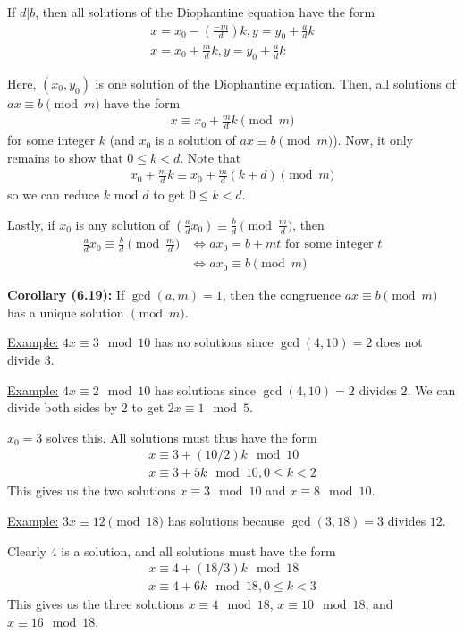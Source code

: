 \documentclass{article}
\begin{document}
If $d|b$, then all solutions of the Diophantine equation have the form \begin{align*}
    x=x_0-(\frac{-m}{d})k, y=y_0+\frac{a}{d}k\\
    x=x_0+\frac{m}{d}k, y=y_0+\frac{a}{d}k
\end{align*}

Here, $(x_0, y_0)$ is one solution of the Diophantine equation. Then, all solutions of $ax\equiv b\pmod m$ have the form \begin{align*}
    x\equiv x_0+\frac{m}{d}k\pmod m
\end{align*} for some integer $k$ (and $x_0$ is a solution of $ax\equiv b\pmod m$). Now, it only remains to show that $0\leq k<d$. Note that \begin{align*}
    x_0+\frac{m}{d}k\equiv x_0+\frac{m}{d}(k+d)\pmod m
\end{align*}so we can reduce $k$ mod $d$ to get $0\leq k<d$.

Lastly, if $x_0$ is any solution of $(\frac{a}{d}x_0)\equiv \frac{b}{d}\pmod{\frac{m}{d}}$, then \begin{align*}
    \frac{a}{d}x_0\equiv \frac{b}{d}\pmod{\frac{m}{d}}&\iff ax_0=b+mt\text{ for some integer } t\\
    &\iff ax_0\equiv b\pmod m
\end{align*}

\textbf{Corollary (6.19):} If $\gcd(a,m)=1$, then the congruence $ax\equiv b\pmod m$ has a unique solution $\pmod m$.

\underline{Example:} $4x\equiv 3\mod 10$ has no solutions since $\gcd(4,10)=2$ does not divide $3$.

\underline{Example:} $4x\equiv 2\mod 10$ has solutions since $\gcd(4,10)=2$ divides $2$. We can divide both sides by 2 to get $2x\equiv 1\mod 5$. 

$x_0=3$ solves this. All solutions must thus have the form \begin{align*}
    x\equiv 3+(10/2)k\mod 10\\
    x\equiv 3+5k\mod 10, 0\leq k<2
\end{align*}This gives us the two solutions $x\equiv 3\mod 10$ and $x\equiv 8\mod 10$.

\underline{Example:} $3x\equiv 12\pmod 18$ has solutions because $\gcd(3,18)=3$ divides $12$. 

Clearly $4$ is a solution, and all solutions must have the form \begin{align*}
    x\equiv 4+(18/3)k\mod 18\\
    x\equiv 4+6k\mod 18, 0\leq k<3
\end{align*}This gives us the three solutions $x\equiv 4\mod 18$, $x\equiv 10\mod 18$, and $x\equiv 16\mod 18$.
\end{document}
